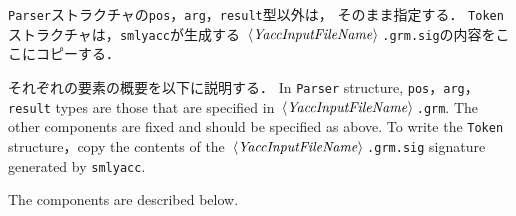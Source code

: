 \documentclass{jbook}
\newcommand{\code}[1]{\mbox{\large\tt #1}}
\newcommand{\nonterm}[1]{\mbox{$\,\langle$}{\it #1}\mbox{$\rangle\,$}}
\begin{document}
\ifjp%
	\code{Parser}ストラクチャの\code{pos}，\code{arg}，\code{result}型以外は，
そのまま指定する．
	\code{Token}ストラクチャは，\code{smlyacc}が生成する
\code{$\nonterm{YaccInputFileName}$.grm.sig}の内容をここにコピーする．

	それぞれの要素の概要を以下に説明する．
\else%
	In \code{Parser} structure, \code{pos}，\code{arg}，
\code{result} types are those that are specified in 
\code{$\nonterm{YaccInputFileName}$.grm}.
	The other components are fixed and should be specified as above.
	To write the \code{Token} structure，copy the contents of
the \code{$\nonterm{YaccInputFileName}$.grm.sig} signature generated by \code{smlyacc}.

	The components are described below.
\fi%
\end{document}
